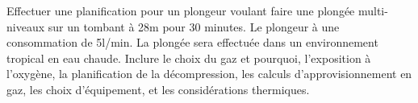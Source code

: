 \documentclass[english,12pt,a4paper]{article}
\begin{document}
\begin{outline}
		\1 Effectuer une planification pour un plongeur voulant faire une plongée multi-niveaux sur un tombant à 28m pour 30 minutes. Le plongeur à une consommation de 5l/min. La plongée sera effectuée dans un environnement tropical en eau chaude. Inclure le choix du gaz et pourquoi, l'exposition à l'oxygène, la planification de la décompression, les calculs d'approvisionnement en gaz, les choix d'équipement, et les considérations thermiques.
			\2[] \hspace{-2em}\hrulefill
			\2[] \hspace{-2em}\hrulefill
			\2[] \hspace{-2em}\hrulefill
			\2[] \hspace{-2em}\hrulefill
			\2[] \hspace{-2em}\hrulefill
			\2[] \hspace{-2em}\hrulefill
			\2[] \hspace{-2em}\hrulefill
			\2[] \hspace{-2em}\hrulefill
	\end{outline}
	\pagebreak

\end{document}
